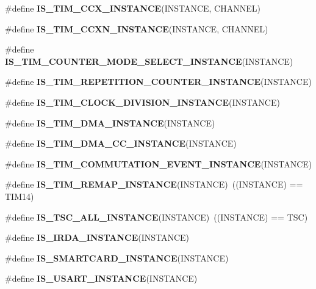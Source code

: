 \begin{DoxyCompactItemize}
\item 
\#define {\bfseries I\+S\+\_\+\+T\+I\+M\+\_\+\+C\+C\+X\+\_\+\+I\+N\+S\+T\+A\+N\+CE}(I\+N\+S\+T\+A\+N\+CE,  C\+H\+A\+N\+N\+EL)
\item 
\#define {\bfseries I\+S\+\_\+\+T\+I\+M\+\_\+\+C\+C\+X\+N\+\_\+\+I\+N\+S\+T\+A\+N\+CE}(I\+N\+S\+T\+A\+N\+CE,  C\+H\+A\+N\+N\+EL)
\item 
\#define {\bfseries I\+S\+\_\+\+T\+I\+M\+\_\+\+C\+O\+U\+N\+T\+E\+R\+\_\+\+M\+O\+D\+E\+\_\+\+S\+E\+L\+E\+C\+T\+\_\+\+I\+N\+S\+T\+A\+N\+CE}(I\+N\+S\+T\+A\+N\+CE)
\item 
\#define {\bfseries I\+S\+\_\+\+T\+I\+M\+\_\+\+R\+E\+P\+E\+T\+I\+T\+I\+O\+N\+\_\+\+C\+O\+U\+N\+T\+E\+R\+\_\+\+I\+N\+S\+T\+A\+N\+CE}(I\+N\+S\+T\+A\+N\+CE)
\item 
\#define {\bfseries I\+S\+\_\+\+T\+I\+M\+\_\+\+C\+L\+O\+C\+K\+\_\+\+D\+I\+V\+I\+S\+I\+O\+N\+\_\+\+I\+N\+S\+T\+A\+N\+CE}(I\+N\+S\+T\+A\+N\+CE)
\item 
\#define {\bfseries I\+S\+\_\+\+T\+I\+M\+\_\+\+D\+M\+A\+\_\+\+I\+N\+S\+T\+A\+N\+CE}(I\+N\+S\+T\+A\+N\+CE)
\item 
\#define {\bfseries I\+S\+\_\+\+T\+I\+M\+\_\+\+D\+M\+A\+\_\+\+C\+C\+\_\+\+I\+N\+S\+T\+A\+N\+CE}(I\+N\+S\+T\+A\+N\+CE)
\item 
\#define {\bfseries I\+S\+\_\+\+T\+I\+M\+\_\+\+C\+O\+M\+M\+U\+T\+A\+T\+I\+O\+N\+\_\+\+E\+V\+E\+N\+T\+\_\+\+I\+N\+S\+T\+A\+N\+CE}(I\+N\+S\+T\+A\+N\+CE)
\item 
\mbox{\label{group___exported__macro_ga6bb03cf116b07bfe1bd527f8ab61a7f9}} 
\#define {\bfseries I\+S\+\_\+\+T\+I\+M\+\_\+\+R\+E\+M\+A\+P\+\_\+\+I\+N\+S\+T\+A\+N\+CE}(I\+N\+S\+T\+A\+N\+CE)~((I\+N\+S\+T\+A\+N\+CE) == T\+I\+M14)
\item 
\mbox{\label{group___exported__macro_gaf29af2609f6b7748104a965262e95475}} 
\#define {\bfseries I\+S\+\_\+\+T\+S\+C\+\_\+\+A\+L\+L\+\_\+\+I\+N\+S\+T\+A\+N\+CE}(I\+N\+S\+T\+A\+N\+CE)~((I\+N\+S\+T\+A\+N\+CE) == T\+SC)
\item 
\#define {\bfseries I\+S\+\_\+\+I\+R\+D\+A\+\_\+\+I\+N\+S\+T\+A\+N\+CE}(I\+N\+S\+T\+A\+N\+CE)
\item 
\#define {\bfseries I\+S\+\_\+\+S\+M\+A\+R\+T\+C\+A\+R\+D\+\_\+\+I\+N\+S\+T\+A\+N\+CE}(I\+N\+S\+T\+A\+N\+CE)
\item 
\#define {\bfseries I\+S\+\_\+\+U\+S\+A\+R\+T\+\_\+\+I\+N\+S\+T\+A\+N\+CE}(I\+N\+S\+T\+A\+N\+CE)
\item 

\end{DoxyCompactItemize}
